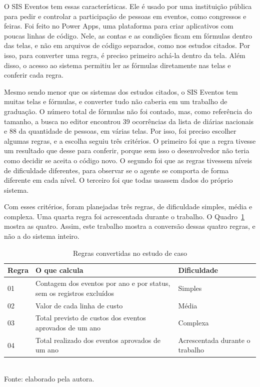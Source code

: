 O SIS Eventos tem essas características. Ele é usado por uma instituição pública para pedir e controlar a participação de pessoas em eventos, como congressos e feiras. Foi feito no Power Apps, uma plataforma para criar aplicativos com poucas linhas de código. Nele, as contas e as condições ficam em fórmulas dentro das telas, e não em arquivos de código separados, como nos estudos citados. Por isso, para converter uma regra, é preciso primeiro achá-la dentro da tela. Além disso, o acesso ao sistema permitiu ler as fórmulas diretamente nas telas e conferir cada regra.

Mesmo sendo menor que os sistemas dos estudos citados, o SIS Eventos tem muitas telas e fórmulas, e converter tudo não caberia em um trabalho de graduação. O número total de fórmulas não foi contado, mas, como referência do tamanho, a busca no editor encontrou 39 ocorrências da lista de diárias nacionais e 88 da quantidade de pessoas, em várias telas. Por isso, foi preciso escolher algumas regras, e a escolha seguiu três critérios. O primeiro foi que a regra tivesse um resultado que desse para conferir, porque sem isso o desenvolvedor não teria como decidir se aceita o código novo. O segundo foi que as regras tivessem níveis de dificuldade diferentes, para observar se o agente se comporta de forma diferente em cada nível. O terceiro foi que todas usassem dados do próprio sistema.

Com esses critérios, foram planejadas três regras, de dificuldade simples, média e complexa. Uma quarta regra foi acrescentada durante o trabalho. O Quadro~\ref{quad:regras} mostra as quatro. Assim, este trabalho mostra a conversão dessas quatro regras, e não a do sistema inteiro.

\begin{table}[htbp]
\centering
\caption{Regras convertidas no estudo de caso}
\label{quad:regras}
\small
\begin{tabular}{p{1.2cm}p{7.4cm}p{3.6cm}}
\toprule
\textbf{Regra} & \textbf{O que calcula} & \textbf{Dificuldade} \\
\midrule
01 & Contagem dos eventos por ano e por status, sem os registros excluídos & Simples \\
02 & Valor de cada linha de custo & Média \\
03 & Total previsto de custos dos eventos aprovados de um ano & Complexa \\
04 & Total realizado dos eventos aprovados de um ano & Acrescentada durante o trabalho \\
\bottomrule
\end{tabular}
\\[2pt]
\footnotesize Fonte: elaborado pela autora.
\end{table}

